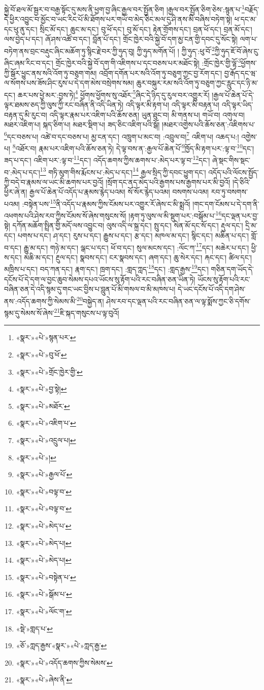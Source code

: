 སྐྱེ་བོ་ཐལ་མོ་སྦྱར་བ་བརྒྱ་སྟོང་དུ་མས་ནི་ཕྱག་བྱ་ཞིང་རྒྱལ་བར་སྤྱོན་ཅིག །རྒྱལ་བར་སྤྱོན་ཅིག་ཅེས་:སྙན་པ་\footnote{«སྣར་»«པེ་»སྙན་པར་}བརྗོད་དེ་ཕྱིར་འབྱུང་བ་མྱོང་བ་ཡང་རིང་པོ་མི་ཐོགས་པར་གཡོ་བ་མེད་ཅིང་མལ་དུ་ཤི་ནས་མི་བཞིས་བཏེག་སྟེ། ཕ་དང་མ་དང་ཕུ་ནུ་དང་། སྲིང་མོ་དང་། ཆུང་མ་དང་། བུ་ཕོ་དང་། བུ་མོ་དང་། རྟེན་གྲོགས་དང་། བྲན་ཕོ་དང་། བྲན་མོ་དང་། ལས་བྱེད་པ་དང་། ཞོ་ཤས་འཚོ་བ་དང་། བློན་པོ་དང་། གྲོང་ཁྱེར་བའི་སྐྱེ་བོ་དག་མྱ་ངན་གྱི་དབང་དུ་སོང་སྟེ། ལག་པ་བཏེག་ནས་བྲང་བརྡུང་ཞིང་མཆོག་ཏུ་སྙིང་རྗེ་བར་ཀྱི་ཧུད་བུ། ཀྱི་ཧུད་མགོན་པོ། །
ཀྱི་ཧུད་:ཕུ་བོ་\footnote{«སྣར་»«པེ་»བུ་ཕོ་}ཀྱི་ཧུད་ཇོ་བོ་ཞེས་ངུ་ཞིང་ཞམ་རིང་བ་དང་། གྲོང་ཁྱེར་བའི་སྐྱེ་བོ་དག་གི་འཇིགས་པ་དང་བཅས་པར་མཐོང་སྟེ། :གྲོང་ཁྱེར་གྱི་ལྷོ་\footnote{«སྣར་»«པེ་»གྲོང་ཁྱེར་གྱི་}ཕྱོགས་ཀྱི་སྒོར་ཕྱུང་ནས་སའི་འོག་ཏུ་བཅུག་གམ། འབྲོག་དགོན་པར་སའི་འོག་ཏུ་བཅུག་ཀྱང་བྱ་རོག་དང་། བྱ་རྒོད་དང་ཝ་ལ་སོགས་པས་ཟོས་ཤིང་རུས་པ་དེ་དག་མེས་བསྲེགས་སམ། ཆུར་བསྐུར་རམ་སའི་འོག་ཏུ་བཅུག་ཀྱང་རླུང་དང་ཉི་མ་དང་། ཆར་པས་ཕྱེ་མར་:བྱས་ཏེ།\footnote{«སྣར་»«པེ་»བྱ་སྟེ།} ཕྱོགས་ཕྱོགས་སུ་འཐོར་\footnote{«སྣར་»«པེ་»མཐོར་}ཞིང་དེ་ཉིད་དུ་རུལ་བར་འགྱུར་རོ། །རྒྱལ་པོ་ཆེན་པོ་དེ་ལྟར་ཐམས་ཅད་ཀྱི་ལུས་ཀྱི་རང་བཞིན་ནི་འདི་ཡིན་ཏེ། འདི་ལྟར་མི་རྟག་པ། འདི་ལྟར་མི་བརྟན་པ། འདི་ལྟར་ཡིད་བརྟན་དུ་མི་རུང་བ། འདི་ལྟར་རྣམ་པར་འཇིག་པའི་ཆོས་ཅན། ཡུན་ཐུང་བ། མི་གནས་པ། གཡོ་བ། འགུལ་བ། མཐར་འཇིག་པ། སྐད་ཅིག་པ། མཐར་སྡིག་པ། ཟད་ཅིང་འཇིག་པའི་སྒོ། །མཐར་འགྱེས་པའི་ཆོས་ཅན་:འཇིགས་པ་\footnote{«སྣར་»«པེ་»འཇིག་པ་}དང་བཅས་པ། འཚེ་བ་དང་བཅས་པ། མྱ་ངན་དང་། འཁྲུག་པ་མང་བ། :འབྲུལ་བ།\footnote{«སྣར་»«པེ་»འདྲུལ་པ།} འཇིག་པ། འཆད་པ:། འགྱེས་པ། \footnote{«སྣར་»«པེ་»།  }འཐོར་བ། རྣམ་པར་འཇིག་པའི་ཆོས་ཅན་ཏེ། དེ་ལྟ་བས་ན་:རྒྱལ་པོ་ཆེན་པོ་\footnote{«སྣར་»«པེ་»རྒྱལ་པོ་}ཁྱོད་མི་རྟག་པར་:ལྟ་བ་\footnote{«སྣར་»«པེ་»བལྟ་བ་}དང་། ཟད་པ་དང་། འཇིག་པར་:ལྟ་བ་\footnote{«སྣར་»«པེ་»བལྟ་བ་}དང་། འདོད་ཆགས་ཀྱིས་ཆགས་པ་:མེད་པར་ལྟ་བ་\footnote{«སྣར་»«པེ་»མེད་པ་}དང་། ཞེ་སྡང་གིས་སྡང་བ་:མེད་པ་དང་།\footnote{«སྣར་»«པེ་»མེད་པ།} གཏི་མུག་གིས་རྨོངས་པ་:མེད་པ་དང་།\footnote{«སྣར་»«པེ་»མེད་པ།} རྒྱལ་སྲིད་ཀྱི་དབང་ཕྱུག་དང་། འདོད་པའི་ལོངས་སྤྱོད་ཀྱི་བདེ་བ་རྣམས་ལ་ཡང་མི་ཆགས་པར་བྱའོ། །སྲོག་དང་ནད་མེད་པའི་རྒྱགས་པས་རྒྱགས་པར་མི་བྱའོ། །དེ་ཅིའི་ཕྱིར་ཞེ་ན། རྒྱལ་པོ་ཆེན་པོ་འདོད་པ་རྣམས་རྙེད་པའམ། སོ་སོར་རྙེད་པའམ། བསགས་པའམ། རབ་ཏུ་བསགས་པའམ། :བསྟེན་པས་\footnote{«སྣར་»«པེ་»བསྟེན་པ་}ནི་འདོད་པ་རྣམས་ཀྱིས་ངོམས་པར་འགྱུར་རོ་ཞེས་ང་མི་སྨྲའོ། །གང་དག་ངོམས་པ་དེ་དག་ནི་འཕགས་པའི་ཤེས་རབ་ཀྱིས་ངོམས་སོ་ཞེས་གསུངས་སོ། །རྟག་ཏུ་ལུས་ལ་མི་སྡུག་པར་:བསྒོམ་པ་\footnote{«སྣར་»«པེ་»སྒོམ་པ་}དང་ལྡན་པར་བྱ་སྟེ། དཀོན་མཆོག་སྤྲིན་གྱི་མདོ་ལས་འབྱུང་བ། ལུས་འདི་ལ་སྐྲ་དང་། སྤུ་དང་། སེན་མོ་དང་སོ་དང་། རྡུལ་དང་། དྲི་མ་དང་། པགས་པ་དང་། ཤ་དང་། རུས་པ་དང་། རྒྱུས་པ་དང་། རྩ་དང་། མཁལ་མ་དང་། སྙིང་དང་། མཆིན་པ་དང་། གློ་བ་དང་། རྒྱུ་མ་དང་། གཉེ་མ་དང་། ལྒང་པ་དང་། ཕོ་བ་དང་། སུལ་མངས་དང་། :ལོང་ཀ་\footnote{«སྣར་»«པེ་»ལོང་ག་}དང་། མཆེར་པ་དང་། ཕྱི་ས་དང་། མཆི་མ་དང་། རྔུལ་དང་། སྣབས་དང་། ངར་སྣབས་དང་། ཞག་དང་། ཆུ་སེར་དང་། རྐང་དང་། ཚིལ་དང་། མཁྲིས་པ་དང་། བད་ཀན་དང་། རྣག་དང་། ཁྲག་དང་། :གླད་ཀླད་\footnote{«སྡེ་»གླད་པ་}དང་། :གླད་རྒྱས་\footnote{«ཅོ་»ཀླད་རྒྱས་«སྣར་»«པེ་»ཀླད་རྒྱ་}དང་། གཅིན་དག་ཡོད་དེ་དངོས་པོ་དེ་དག་ལ་བྱང་ཆུབ་སེམས་དཔའ་ཡོངས་སུ་རྟོག་པའི་རང་བཞིན་ཅན་ཡིན་ཏེ། ཡོངས་སུ་རྟོག་པའི་རང་བཞིན་ཅན་དེ་འདི་སྙམ་དུ་གང་ཡང་བྱིས་པ་བླུན་པོ་མི་གསལ་བ་མི་མཁས་པ། དེ་ཡང་དངོས་པོ་འདི་དག་ཤེས་ནས་:འདོད་ཆགས་ཀྱི་སེམས་མི་\footnote{«སྣར་»«པེ་»འདོད་ཆགས་ཀྱིས་སེམས་}བསྐྱེད་ན། ཤེས་རབ་དང་ལྡན་པའི་རང་བཞིན་ཅན་ལ་ལྟ་སྨོས་ཀྱང་ཅི་དགོས་སྙམ་དུ་སེམས་སོ་ཞེས་\footnote{«སྣར་»«པེ་»ཞེས་ནི་}ཇི་སྐད་གསུངས་པ་ལྟ་བུའོ། 